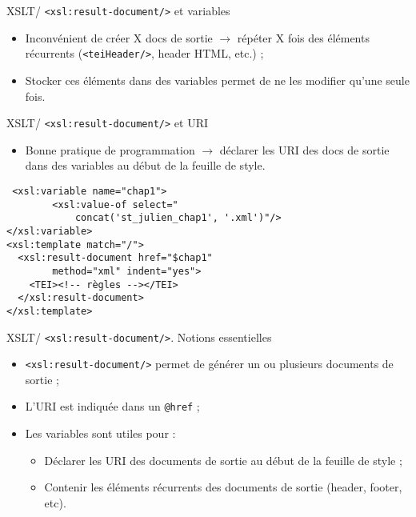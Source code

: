 \documentclass{beamer}
\begin{document}
    \begin{frame}{XSLT/ \texttt{<xsl:result-document/>} et variables}
    \Large
    \begin{itemize}
        \item Inconvénient de créer X docs de sortie $\rightarrow$ répéter X fois des éléments récurrents (\texttt{<teiHeader/>}, header HTML, etc.) ;
        \item Stocker ces éléments dans des variables permet de ne les modifier qu'une seule fois.
    \end{itemize}
    \end{frame}

     \begin{frame}[fragile]{XSLT/ \texttt{<xsl:result-document/>} et URI}
    \Large
    \begin{itemize}
        \item Bonne pratique de programmation $\rightarrow$ déclarer les URI des docs de sortie dans des variables au début de la feuille de style.
    \end{itemize}
    \normalsize
    \begin{verbatim}
 <xsl:variable name="chap1">
        <xsl:value-of select="
            concat('st_julien_chap1', '.xml')"/>
</xsl:variable>
<xsl:template match="/">
  <xsl:result-document href="$chap1"
        method="xml" indent="yes">
    <TEI><!-- règles --></TEI>
  </xsl:result-document>
</xsl:template>
    \end{verbatim}
    \end{frame}

    \begin{frame}{XSLT/ \texttt{<xsl:result-document/>}. Notions essentielles}
        \Large
        \begin{itemize}
            \item \texttt{<xsl:result-document/>} permet de générer un ou plusieurs documents de sortie ;
            \bigskip
            \item L'URI est indiquée dans un \texttt{@href} ;
            \bigskip
            \item Les variables sont utiles pour :
            \begin{itemize}
                \item Déclarer les URI des documents de sortie au début de la feuille de style ;
                \item Contenir les éléments récurrents des documents de sortie (header, footer, etc).
            \end{itemize}
        \end{itemize}
    \end{frame}
    
\end{document}
